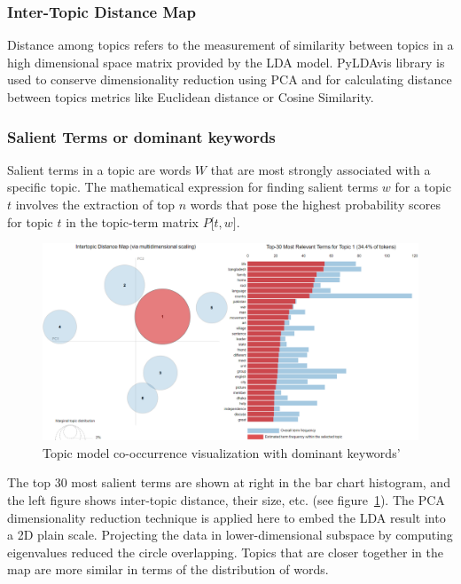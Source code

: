 \documentclass[sn-mathphys,Numbered]{sn-jnl}%
\theoremstyle{thmstyleone}%
\theoremstyle{thmstyletwo}%
\theoremstyle{thmstylethree}%
\begin{document}
\subsubsection{Inter-Topic Distance Map}

Distance among topics refers to the measurement of similarity between topics in a high dimensional space matrix provided by the LDA model. PyLDAvis library is used to conserve dimensionality reduction using PCA and for calculating distance between topics metrics like Euclidean distance or Cosine Similarity. \\

\subsubsection{Salient Terms or dominant keywords} Salient terms in a topic are words \(W\) that are most strongly associated with a specific topic. The mathematical expression for finding salient terms \(w\) for a topic \(t\) involves the extraction of top \(n\) words that pose the highest probability scores for topic \(t\) in the topic-term matrix \(P\lbrack t,w\rbrack\).

\begin{figure}[h]
\centerline{\includegraphics[width=\textwidth]{pyldvis.png}}
\caption{Topic model co-occurrence visualization with dominant keywords'}
\label{Relative_weight_pyldvis}
\end{figure}

The top 30 most salient terms are shown at right in the bar chart histogram, and the left figure shows inter-topic distance, their size, etc. (see figure~\ref{Relative_weight_pyldvis}). The PCA dimensionality reduction technique is applied here to embed the LDA result into a 2D plain scale. Projecting the data in lower-dimensional subspace by computing eigenvalues reduced the circle overlapping. Topics that are closer together in the map are more similar in terms of the distribution of words.\\
\end{document}
